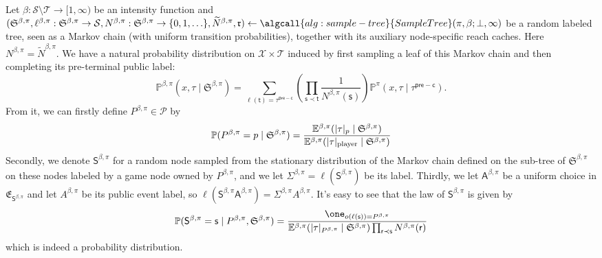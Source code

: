\documentclass[12pt, a4paper]{article}
\begin{document}
\begin{definition}\label{def:branched-rollout-tree}
Let $\beta : \mathcal S \setminus \mathcal T \to [1, \infty)$ be an intensity function and $(\mathfrak{S}^{\beta,\pi}, \ell^{\beta,\pi}:\mathfrak{S}^{\beta,\pi}\to\mathcal S, N^{\beta,\pi}:\mathfrak{S}^{\beta,\pi}\to\{0,1,\ldots\},\widetilde N^{\beta,\pi},\mathfrak r) \gets \algcall{alg:sample-tree}{SampleTree}(\pi, \beta;\bot,\infty)$ be a random labeled tree, seen as a Markov chain (with uniform transition probabilities), together with its auxiliary node-specific reach caches.  Here $N^{\beta,\pi}=\widetilde N^{\beta,\pi}$.
We have a natural probability distribution on $\mathcal{X} \times \mathcal{T}$ induced by first sampling a leaf of this Markov chain and then completing its pre-terminal public label:
\begin{equation}\label{eq:branched-terminal-law}
  \mathbb{P}^{\beta, \pi}(x,\tau \mid \mathfrak{S}^{\beta, \pi})
  = \sum_{\ell(\mathsf{t})=\tau^{\mathsf{pre-c}}}
    \left(\prod_{\mathsf{s} \prec \mathsf{t}} \frac{1}{N^{\beta,\pi}(\mathsf{s})}\right)
    \mathbb P^\pi(x,\tau\mid\tau^{\mathsf{pre-c}}).
\end{equation}
From it, we can firstly define $P^{\beta, \pi} \in \mathcal{P}$ by
\begin{equation}\label{eq:branched-player-law}
  \mathbb{P}(P^{\beta, \pi} = p \mid \mathfrak{S}^{\beta, \pi})
  = \frac{\mathbb{E}^{\beta, \pi}(|\tau|_p \mid \mathfrak{S}^{\beta, \pi})}
    {\mathbb{E}^{\beta, \pi}(|\tau|_{\textnormal{player}} \mid \mathfrak{S}^{\beta, \pi})}
\end{equation}
Secondly, we denote $\mathsf{S}^{\beta, \pi}$ for a random node sampled from the stationary distribution of the Markov chain defined on the sub-tree of $\mathfrak{S}^{\beta, \pi}$ on these nodes labeled by a game node owned by $P^{\beta, \pi}$, and we let $\Sigma^{\beta, \pi} = \ell(\mathsf{S}^{\beta, \pi})$ be its label.
Thirdly, we let $\mathsf{A}^{\beta, \pi}$ be a uniform choice in $\mathfrak{E}_{\mathsf{S}^{\beta,\pi}}$ and let $A^{\beta, \pi}$ be its public event label, so $\ell(\mathsf{S}^{\beta,\pi}\mathsf{A}^{\beta,\pi})=\Sigma^{\beta,\pi}A^{\beta,\pi}$.
It's easy to see that the law of $\mathsf{S}^{\beta, \pi}$ is given by
\begin{equation}\label{eq:branched-stationary-node-law}
  \mathbb{P}(\mathsf{S}^{\beta,\pi} = \mathsf{s} \mid P^{\beta, \pi}, \mathfrak{S}^{\beta, \pi})
  = \frac{\one_{o(\ell(\mathsf{s})) = P^{\beta, \pi}}}
         {\mathbb{E}^{\beta, \pi}(|\tau|_{P^{\beta, \pi}} \mid \mathfrak{S}^{\beta, \pi}) \prod_{\mathsf{r} \prec \mathsf{s}} N^{\beta,\pi}(\mathsf{r})}
\end{equation}
which is indeed a probability distribution.
\end{definition}
\end{document}
